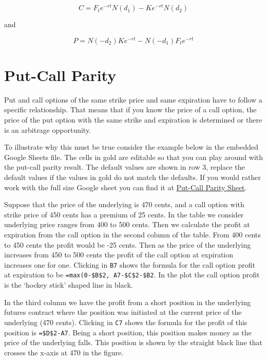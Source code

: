 \documentclass[
]{book}
\begin{document}
\[
C = F_{t} e^{-rt} N(d_{1}) - K e^{-rt} N(d_{2})
\]

and

\[
P = N(-d_{2}) K e^{-rt} - N(-d_{1}) F_{t} e^{-rt}
\]

\hypertarget{put-call-parity}{%
\section{Put-Call Parity}\label{put-call-parity}}

Put and call options of the same strike price and same expiration have to follow a specific relationship. That means that if you know the price of a call option, the price of the put option with the same strike and expiration is determined or there is an arbitrage opportunity.

To illustrate why this must be true consider the example below in the embedded Google Sheets file. The cells in gold are editable so that you can play around with the put-call parity result. The default values are shown in row 3, replace the default values if the values in gold do not match the defaults. If you would rather work with the full size Google sheet you can find it at \href{https://docs.google.com/spreadsheets/d/1ivvTGqC9R4L3zkG8c4ApDg8dC1LHj4v_8uLjgiurxX0/edit?usp=sharing}{Put-Call Parity Sheet}.

Suppose that the price of the underlying is 470 cents, and a call option with strike price of 450 cents has a premium of 25 cents. In the table we consider underlying price ranges from 400 to 500 cents. Then we calculate the profit at expiration from the call option in the second column of the table. From 400 cents to 450 cents the profit would be -25 cents. Then as the price of the underlying increases from 450 to 500 cents the profit of the call option at expiration increases one for one. Clicking in \texttt{B7} shows the formula for the call option profit at expiration to be \texttt{=max(0-\$B\$2,\ A7-\$C\$2-\$B2}. In the plot the call option profit is the `hockey stick' shaped line in black.

In the third column we have the profit from a short position in the underlying futures contract where the position was initiated at the current price of the underlying (470 cents). Clicking in \texttt{C7} shows the formula for the profit of this position is \texttt{=\$D\$2-A7}. Being a short position, this position makes money as the price of the underlying falls. This position is shown by the straight black line that crosses the x-axis at 470 in the figure.
\end{document}
